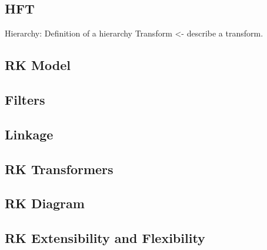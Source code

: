 \subsection{HFT}
Hierarchy: Definition of a hierarchy
Transform <-  describe a transform.

\subsection{RK Model}
\subsection{Filters}
\subsection{Linkage}
\subsection{RK Transformers}
\subsection{RK Diagram}
\subsection{RK Extensibility and Flexibility}
